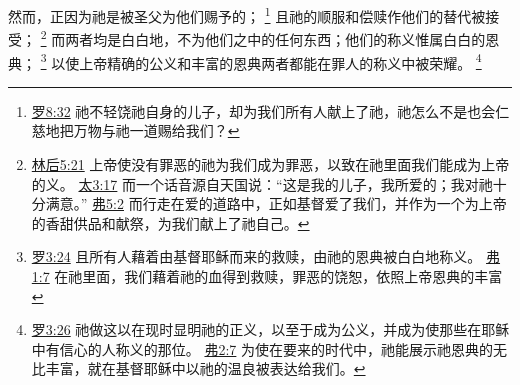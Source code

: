 \documentclass[12pt, a4paper, oneside]{ctexart}
\begin{document}
	然而，正因为祂是被圣父为他们赐予的；
	\footnote {
		\href{https://biblehub.com/romans/8-32.htm}{罗8:32} 祂不轻饶祂自身的儿子，却为我们所有人献上了祂，祂怎么不是也会仁慈地把万物与祂一道赐给我们？
	}
	且祂的顺服和偿赎作他们的替代被接受；
	\footnote {
		\href{https://biblehub.com/2_corinthians/5-21.htm}{林后5:21} 上帝使没有罪恶的祂为我们成为罪恶，以致在祂里面我们能成为上帝的义。
		\href{https://biblehub.com/matthew/3-17.htm}{太3:17} 而一个话音源自天国说：“这是我的儿子，我所爱的；我对祂十分满意。”
		\href{https://biblehub.com/ephesians/5-2.htm}{弗5:2} 而行走在爱的道路中，正如基督爱了我们，并作为一个为上帝的香甜供品和献祭，为我们献上了祂自己。
	}
	而两者均是白白地，不为他们之中的任何东西；他们的称义惟属白白的恩典；
	\footnote {
		\href{https://biblehub.com/romans/3-24.htm}{罗3:24} 且所有人藉着由基督耶稣而来的救赎，由祂的恩典被白白地称义。
		\href{https://biblehub.com/ephesians/1-7.htm}{弗1:7} 在祂里面，我们藉着祂的血得到救赎，罪恶的饶恕，依照上帝恩典的丰富
	}
	以使上帝精确的公义和丰富的恩典两者都能在罪人的称义中被荣耀。
	\footnote {
		\href{https://biblehub.com/romans/3-26.htm}{罗3:26} 祂做这以在现时显明祂的正义，以至于成为公义，并成为使那些在耶稣中有信心的人称义的那位。
		\href{https://biblehub.com/ephesians/2-7.htm}{弗2:7} 为使在要来的时代中，祂能展示祂恩典的无比丰富，就在基督耶稣中以祂的温良被表达给我们。
	}
\end{document}
